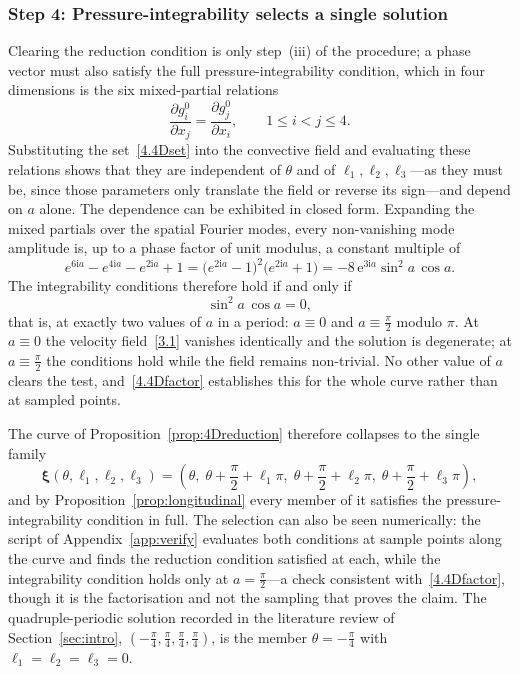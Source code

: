 \documentclass[11pt]{jfm}
\let\le=\leqslant  \let\leq=\leqslant
\numberwithin{equation}{section}
\begin{document}
\subsubsection{Step 4: Pressure-integrability selects a single solution}
Clearing the reduction condition is only step~(iii) of the procedure; a phase vector must also
satisfy the full pressure-integrability condition, which in four dimensions is the six mixed-partial
relations
\[
\frac{\partial g_i^0}{\partial x_j}=\frac{\partial g_j^0}{\partial x_i},
\qquad 1\le i<j\le 4.
\]
Substituting the set~\eqref{4.4Dset} into the convective field and evaluating these relations shows
that they are independent of $\theta$ and of $\ell_1,\ell_2,\ell_3$---as they must be, since those
parameters only translate the field or reverse its sign---and depend on $a$ alone. The dependence
can be exhibited in closed form. Expanding the mixed partials over the spatial Fourier modes, every
non-vanishing mode amplitude is, up to a phase factor of unit modulus, a constant multiple of
\[
e^{6\mathrm{i}a}-e^{4\mathrm{i}a}-e^{2\mathrm{i}a}+1
=\bigl(e^{2\mathrm{i}a}-1\bigr)^{2}\bigl(e^{2\mathrm{i}a}+1\bigr)
=-8\,\mathrm{e}^{3\mathrm{i}a}\sin^{2}\!a\,\cos a .
\]
The integrability conditions therefore hold if and only if
\begin{equation}
\label{4.4Dfactor}
\sin^{2}\!a\,\cos a = 0 ,
\end{equation}
that is, at exactly two values of $a$ in a period: $a\equiv0$ and $a\equiv\tfrac{\pi}{2}$ modulo
$\pi$. At $a\equiv0$ the velocity field~\eqref{3.1} vanishes identically and the solution is
degenerate; at $a\equiv\tfrac{\pi}{2}$ the conditions hold while the field remains non-trivial. No
other value of $a$ clears the test, and~\eqref{4.4Dfactor} establishes this for the whole curve
rather than at sampled points.

The curve of Proposition~\ref{prop:4Dreduction} therefore collapses to the single family
\begin{equation}
\label{4.4Dsol}
\boldsymbol{\xi}(\theta,\ell_1,\ell_2,\ell_3)=
\left(\theta,\;\theta+\frac{\pi}{2}+\ell_1\pi,\;\theta+\frac{\pi}{2}+\ell_2\pi,\;
\theta+\frac{\pi}{2}+\ell_3\pi\right),
\end{equation}
and by Proposition~\ref{prop:longitudinal} every member of it satisfies the pressure-integrability
condition in full. The selection can also be seen numerically: the script of Appendix~\ref{app:verify} evaluates both
conditions at sample points along the curve and finds the reduction condition satisfied at each,
while the integrability condition holds only at $a=\tfrac{\pi}{2}$---a check consistent
with~\eqref{4.4Dfactor}, though it is the factorisation and not the sampling that proves the
claim. The quadruple-periodic solution recorded in the literature review of
Section~\ref{sec:intro}, $\left(-\tfrac{\pi}{4},\tfrac{\pi}{4},\tfrac{\pi}{4},
\tfrac{\pi}{4}\right)$, is the member $\theta=-\tfrac{\pi}{4}$ with $\ell_1=\ell_2=\ell_3=0$.
\end{document}
